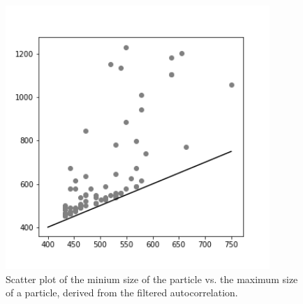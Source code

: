 \begin{figure}[!ht]
\centering
\includegraphics[width=100mm]{Chapter_09_Results_Refined_Sizing.png}
\caption{Scatter plot of the minium size of the particle vs. the maximum size of a particle, derived from the filtered autocorrelation. }\label{fig:majorminor}

\end{figure}





